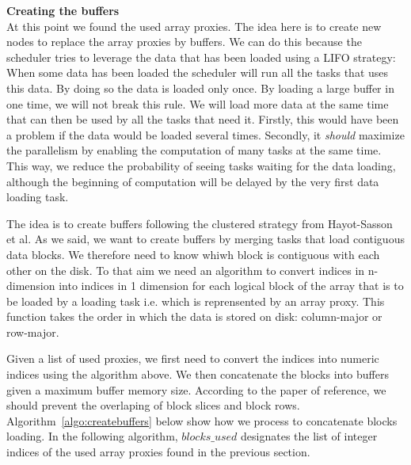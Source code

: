 \documentclass[conference]{IEEEtran}
\begin{document}
\textbf{Creating the buffers} \\
At this point we found the used array proxies. The idea here is to create new nodes to replace the array proxies by buffers. We can do this because the scheduler tries to leverage the data that has been loaded using a LIFO strategy: When some data has been loaded the scheduler will run all the tasks that uses this data. By doing so the data is loaded only once. By loading a large buffer in one time, we will not break this rule. We will load more data at the same time that can then be used by all the tasks that need it. Firstly, this would have been a problem if the data would be loaded several times. Secondly, it \textit{should} maximize the parallelism by enabling the computation of many tasks at the same time. This way, we reduce the probability of seeing tasks waiting for the data loading, although the beginning of computation will be delayed by the very first data loading task.

The idea is to create buffers following the clustered strategy from Hayot-Sasson et al. As we said, we want to create buffers by merging tasks that load contiguous data blocks. We therefore need to know whiwh block is contiguous with each other on the disk. To that aim we need an algorithm to convert indices in n-dimension into indices in 1 dimension for each logical block of the array that is to be loaded by a loading task i.e. which is reprensented by an array proxy. This function takes the order in which the data is stored on disk: column-major or row-major.


Given a list of used proxies, we first need to convert the indices into numeric indices using the algorithm above. We then concatenate the blocks into buffers given a maximum buffer memory size. According to the paper of reference, we should prevent the overlaping of block slices and block rows. Algorithm~\ref{algo:createbuffers} below show how we process to concatenate blocks loading.
In the following algorithm, $blocks\_used$ designates the list of integer indices of the used array proxies found in the previous section.
\end{document}
